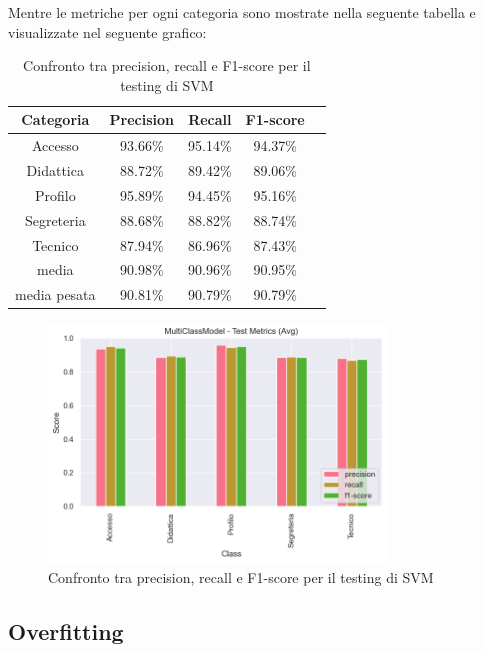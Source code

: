 Mentre le metriche per ogni categoria sono mostrate nella seguente tabella e visualizzate nel seguente grafico:

\begin{table}[H]
    \centering
    \begin{tabular}{|c|c|c|c|c|}
        \hline
        \textbf{Categoria} & \textbf{Precision} & \textbf{Recall} & \textbf{F1-score} \\
        \hline
        Accesso & 93.66\% & 95.14\% & 94.37\% \\
        \hline
        Didattica & 88.72\% & 89.42\% & 89.06\% \\
        \hline
        Profilo & 95.89\% & 94.45\% & 95.16\% \\
        \hline
        Segreteria & 88.68\% & 88.82\% & 88.74\% \\
        \hline
        Tecnico & 87.94\% & 86.96\% & 87.43\% \\
        \hline
        media & 90.98\% & 90.96\% & 90.95\% \\
        \hline
        media pesata & 90.81\% & 90.79\% & 90.79\% \\
        \hline
    \end{tabular}
    \caption{Confronto tra precision, recall e F1-score per il testing di SVM}
    \label{tab:metriche_svm_test}
\end{table}

\begin{figure}[H]
    \centering
    \includegraphics[width=0.8\textwidth]{images/metrics_test_svm.png}
    \caption{Confronto tra precision, recall e F1-score per il testing di SVM}
    \label{fig:metrics_test_svm}
\end{figure}

\subsection{Overfitting}

